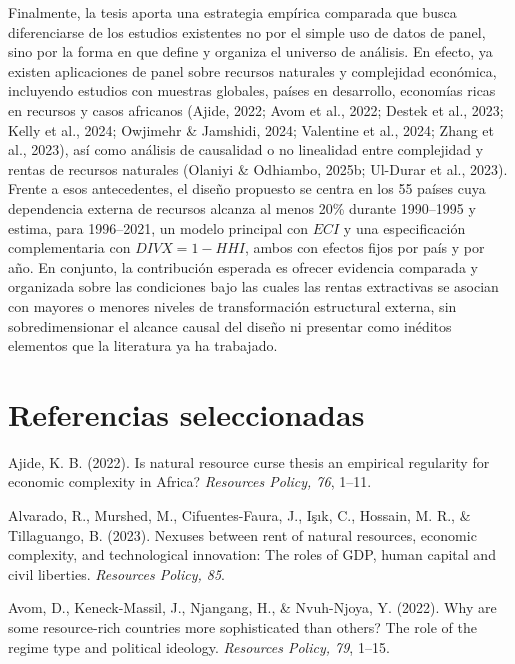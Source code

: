 \documentclass[12pt,a4paper]{article}
\begin{document}
Finalmente, la tesis aporta una estrategia empírica comparada que busca diferenciarse de los estudios existentes no por el simple uso de datos de panel, sino por la forma en que define y organiza el universo de análisis. En efecto, ya existen aplicaciones de panel sobre recursos naturales y complejidad económica, incluyendo estudios con muestras globales, países en desarrollo, economías ricas en recursos y casos africanos (Ajide, 2022; Avom et al., 2022; Destek et al., 2023; Kelly et al., 2024; Owjimehr \& Jamshidi, 2024; Valentine et al., 2024; Zhang et al., 2023), así como análisis de causalidad o no linealidad entre complejidad y rentas de recursos naturales (Olaniyi \& Odhiambo, 2025b; Ul-Durar et al., 2023). Frente a esos antecedentes, el diseño propuesto se centra en los 55 países cuya dependencia externa de recursos alcanza al menos 20\% durante 1990--1995 y estima, para 1996--2021, un modelo principal con $ECI$ y una especificación complementaria con $DIVX=1-HHI$, ambos con efectos fijos por país y por año. En conjunto, la contribución esperada es ofrecer evidencia comparada y organizada sobre las condiciones bajo las cuales las rentas extractivas se asocian con mayores o menores niveles de transformación estructural externa, sin sobredimensionar el alcance causal del diseño ni presentar como inéditos elementos que la literatura ya ha trabajado.

\section*{Referencias seleccionadas}

\begingroup
\small
\setlength{\parindent}{0pt}
\setlength{\parskip}{0.8em}

\hangindent=1.27cm
Ajide, K. B. (2022). Is natural resource curse thesis an empirical regularity for economic complexity in Africa? \textit{Resources Policy, 76}, 1--11.

\hangindent=1.27cm
Alvarado, R., Murshed, M., Cifuentes-Faura, J., Işık, C., Hossain, M. R., \& Tillaguango, B. (2023). Nexuses between rent of natural resources, economic complexity, and technological innovation: The roles of GDP, human capital and civil liberties. \textit{Resources Policy, 85}.

\hangindent=1.27cm
Avom, D., Keneck-Massil, J., Njangang, H., \& Nvuh-Njoya, Y. (2022). Why are some resource-rich countries more sophisticated than others? The role of the regime type and political ideology. \textit{Resources Policy, 79}, 1--15.
\end{document}
